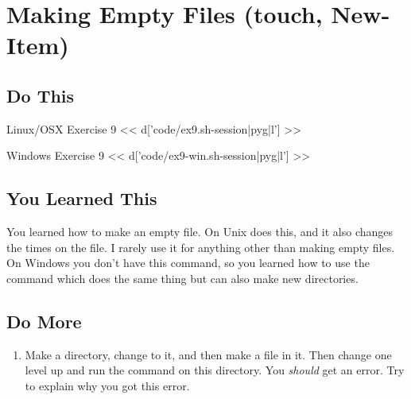 \chapter{Making Empty Files (touch, New-Item)}

\section{Do This}

\begin{code}{Linux/OSX Exercise 9}
<< d['code/ex9.sh-session|pyg|l'] >>
\end{code}

\begin{code}{Windows Exercise 9}
<< d['code/ex9-win.sh-session|pyg|l'] >>
\end{code}

\section{You Learned This}

You learned how to make an empty file.  On Unix  does this, and
it also changes the times on the file.  I rarely use it for anything other than
making empty files.  On Windows you don't have this command, so you learned
how to use the  command which does the same thing but can
also make new directories.

\section{Do More}

\begin{enumerate}
\item Make a directory, change to it, and then make a file in it.  Then change
    one level up and run the  command on this directory.  You
    \emph{should} get an error.  Try to explain why you got this error.
\end{enumerate}

